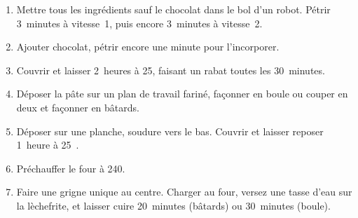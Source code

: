 
\begin{ingredients}
\end{ingredients}


\begin{recipe}
  \begin{enumerate}

  \item Mettre tous les ingrédients sauf le chocolat dans le bol d'un
    robot.  Pétrir 3~minutes à vitesse~1, puis encore 3~minutes à
    vitesse~2.
    
  \item Ajouter chocolat, pétrir encore une minute pour l'incorporer.

  \item Couvrir et laisser 2~heures à 25\degreeC, faisant un rabat
    toutes les 30~minutes.
    
  \item Déposer la pâte sur un plan de travail fariné, façonner en
    boule ou couper en deux et façonner en bâtards.
    
  \item Déposer sur une planche, soudure vers le bas.  Couvrir et
    laisser reposer 1~heure à 25~\degreeC.
    
  \item Préchauffer le four à 240\degreeC.
    
  \item Faire une grigne unique au centre.  Charger au four, versez
    une tasse d'eau sur la lèchefrite, et laisser cuire 20~minutes
    (bâtards) ou 30~minutes (boule).

  \end{enumerate}
\end{recipe}

